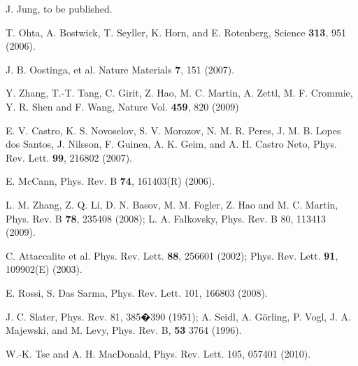 \documentclass[twocolumn,prb,showpacs,preprintnumbers,amsmath,amssymb]{revtex4}
\begin{document}
\begin{thebibliography}{99}
J. Jung, %
to be published.



T. Ohta, A. Bostwick, T. Seyller, K.
Horn, and E. Rotenberg, Science {\bf 313}, 951 (2006).

J. B. Oostinga, et al. %
Nature Materials {\bf 7}, 151 (2007). 

Y. Zhang, T.-T. Tang, C. Girit, Z. Hao, M. C. Martin, A. Zettl, M. F. Crommie, Y. R. Shen and F. Wang,
Nature Vol. {\bf 459}, 820 (2009)

E. V. Castro, K. S. Novoselov, S. V. Morozov, N. M. R. Peres, J. M. B. Lopes dos Santos, 
J. Nilsson, F. Guinea, A. K. Geim, and A. H. Castro Neto,
Phys. Rev. Lett. {\bf 99}, 216802 (2007).

E. McCann, Phys. Rev. B {\bf 74}, 161403(R) (2006).


L. M. Zhang, Z. Q. Li, D. N. Basov, M. M. Fogler, Z. Hao and M. C. Martin,
Phys. Rev. B {\bf 78}, 235408 (2008);
L. A. Falkovsky, Phys. Rev. B 80, 113413 (2009).




C. Attaccalite et al. Phys. Rev. Lett. {\bf 88}, 256601 (2002);
Phys. Rev. Lett. {\bf 91}, 109902(E) (2003).







E. Rossi, S. Das Sarma,
Phys. Rev. Lett. 101, 166803 (2008). 



J. C. Slater, Phys. Rev. 81, 385�390 (1951);
A. Seidl, A. G\"orling, P. Vogl, J. A. Majewski, and M. Levy,
Phys. Rev. B, {\bf 53} 3764 (1996).

W.-K. Tse and A. H. MacDonald,  
Phys. Rev. Lett. 105, 057401 (2010).

\end{thebibliography}
\end{document}
